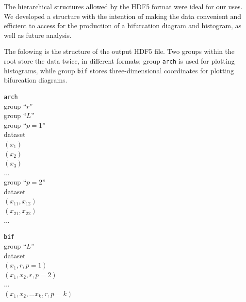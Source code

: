 \documentclass[12pt]{article}
\begin{document}
The hierarchical structures allowed by the HDF5 format were ideal for our uses. We developed a structure with the intention of making the data convenient and efficient to access for the production of a bifurcation diagram and histogram, as well as future analysis.

The folowing is the structure of the output HDF5 file. Two groups
within the root store the data twice, in different formats; group
\texttt{arch} is used for plotting histograms, while group
\texttt{bif} stores three-dimensional coordinates for plotting
bifurcation diagrams.

\begin{tabbing}
\texttt{arch}\\
	\hspace{5mm} group ``$r$'' \\
		\hspace{10mm} group ``$L$'' \\
		\hspace{15mm} group ``$p=1$'' \\
				\hspace{20mm} dataset \\
					\hspace{25mm} $ (x_{1})$ \\
					\hspace{25mm} $ (x_{2})$ \\
					\hspace{25mm} $ (x_{3})$ \\
					\hspace{25mm} ... \\	
			\hspace{15mm} group ``$p=2$'' \\
				\hspace{20mm} dataset \\
					\hspace{25mm}                           $(x_{11},x_{12})$ \\
					\hspace{25mm} $(x_{21},x_{22})$ \\
					\hspace{25mm} ... \\
\end{tabbing}

\begin{tabbing}
\texttt{bif}\\
  \hspace{5mm} group ``$L$'' \\
  \hspace{10mm} dataset \\
  \hspace{15mm} $ (x_{1}, r, p=1)$ \\
  \hspace{15mm} $ (x_{1},x_2, r, p=2)$ \\
  \hspace{15mm} ... \\
  \hspace{15mm} $ (x_{1},x_2,...x_k, r, p=k)$ \\
\end{tabbing}
\end{document}
